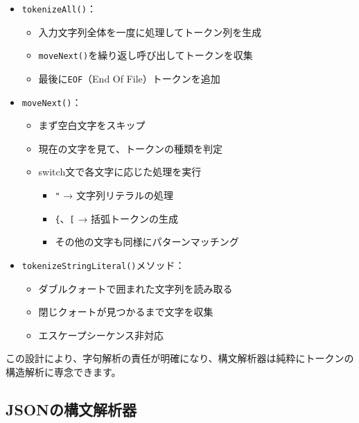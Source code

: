 \begin{itemize}
\tightlist
\item
  \texttt{tokenizeAll()}：

  \begin{itemize}
  \tightlist
  \item
    入力文字列全体を一度に処理してトークン列を生成
  \item
    \texttt{moveNext()}を繰り返し呼び出してトークンを収集
  \item
    最後に\texttt{EOF}（End Of File）トークンを追加
  \end{itemize}
\item
  \texttt{moveNext()}：

  \begin{itemize}
  \tightlist
  \item
    まず空白文字をスキップ
  \item
    現在の文字を見て、トークンの種類を判定
  \item
    switch文で各文字に応じた処理を実行

    \begin{itemize}
    \tightlist
    \item
      \texttt{"} → 文字列リテラルの処理
    \item
      \texttt{\{}、\texttt{{[}} → 括弧トークンの生成
    \item
      その他の文字も同様にパターンマッチング
    \end{itemize}
  \end{itemize}
\item
  \texttt{tokenizeStringLiteral()}メソッド：

  \begin{itemize}
  \tightlist
  \item
    ダブルクォートで囲まれた文字列を読み取る
  \item
    閉じクォートが見つかるまで文字を収集
  \item
    エスケープシーケンス非対応
  \end{itemize}
\end{itemize}

この設計により、字句解析の責任が明確になり、構文解析器は純粋にトークンの構造解析に専念できます。

\hypertarget{chapter3-jsonux306eux69cbux6587ux89e3ux6790ux5668-1}{%
\subsection{JSONの構文解析器}\label{chapter3-jsonux306eux69cbux6587ux89e3ux6790ux5668-1}}

